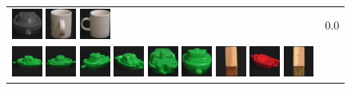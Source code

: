 \begin{figure}[!bp]
\begin{tabular}{m{11cm} | m{3cm} |}
\includegraphics[width=1cm]{coil/beeld-26.eps}
\includegraphics[width=1cm]{coil/beeld-41.eps}
\includegraphics[width=1cm]{coil/beeld-37.eps}
& {\scriptsize 0.0}
\\
\includegraphics[width=1cm]{coil/beeld-54.eps}
\includegraphics[width=1cm]{coil/beeld-55.eps}
\includegraphics[width=1cm]{coil/beeld-57.eps}
\includegraphics[width=1cm]{coil/beeld-58.eps}
\includegraphics[width=1cm]{coil/beeld-59.eps}
\includegraphics[width=1cm]{coil/beeld-56.eps}
\includegraphics[width=1cm]{coil/beeld-44.eps}
\includegraphics[width=1cm]{coil/beeld-22.eps}
\includegraphics[width=1cm]{coil/beeld-47.eps}

\end{tabular}
\end{figure}
